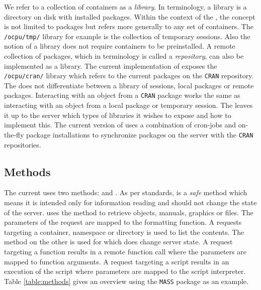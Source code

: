 We refer to a collection of containers as a \emph{library}. In \R terminology, a library is a directory on disk with installed packages. Within the context of the \API, the concept is not limited to packages but refers more generally to any set of containers. The \texttt{/ocpu/tmp/} library for example is the collection of temporary sessions. Also the \API notion of a library does not require containers to be preinstalled. A remote collection of packages, which in \R terminology is called a \emph{repository}, can also be implemented as a library. The current implementation of \OpenCPU exposes the \texttt{/ocpu/cran/} library which refers to the current packages on the \texttt{CRAN} repository. The \API does not differentiate between a library of sessions, local packages or remote packages. Interacting with an object from a \texttt{CRAN} package works the same as interacting with an object from a local package or temporary session. The \API leaves it up to the server which types of libraries it wishes to expose and how to implement this. The current version of \OpenCPU uses a combination of cron-jobs and on-the-fly package installations to synchronize packages on the server with the \texttt{CRAN} repositories.


\subsection{Methods}

The current \API uses two \HTTP methods: \GET and \POST. As per \HTTP standards, \GET is a \emph{safe} method which means it is intended only for information reading and should not change the state of the server. \OpenCPU uses the \GET method to retrieve objects, manuals, graphics or files. The parameters of the request are mapped to the formatting function. A \GET requests targeting a container, namespace or directory is used to list the contents. The \POST method on the other is used for \RPC which does change server state. A \POST request targeting a function results in a remote function call where the \HTTP parameters are mapped to function arguments. A \POST request targeting a script results in an execution of the script where \HTTP parameters are mapped to the script interpreter. Table \ref{table:methods} gives an overview using the \texttt{MASS} package \citep{MASS} as an example.


